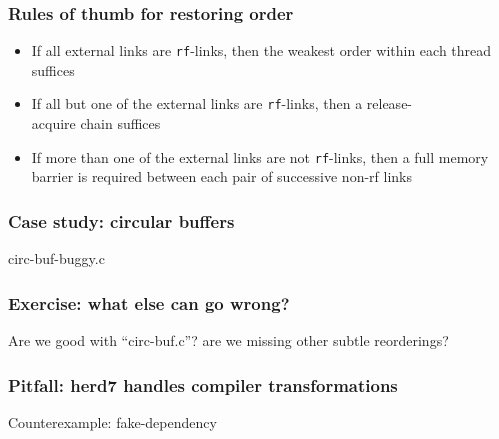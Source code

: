 \documentclass[usenames,dvipsnames]{beamer}
\begin{document}
\begin{frame}[fragile]
\frametitle{Rules of thumb for restoring order}

\begin{itemize}
	\item If all external links are \texttt{rf}-links, then the
	weakest order within each thread suffices

\vspace{2mm}
	\item If all but one of the external links are \texttt{rf}-links,
	then a release-\\acquire chain suffices

\vspace{2mm}
	\item If more than one of the external links are not
	\texttt{rf}-links, then a full memory barrier is required between
	each pair of successive non-rf links
\end{itemize}

\end{frame}


\begin{frame}[fragile]
\frametitle{Case study: circular buffers}

\begin{center}
circ-buf-buggy.c
\end{center}

\end{frame}


\begin{frame}[fragile]
\frametitle{Exercise: what else can go wrong?}

Are we good with ``circ-buf.c''?  are we missing other subtle reorderings?

\end{frame}


\begin{frame}[fragile]
\frametitle{Pitfall: herd7 handles compiler transformations}

\begin{center}
Counterexample: fake-dependency
\end{center}

\end{frame}
\end{document}
